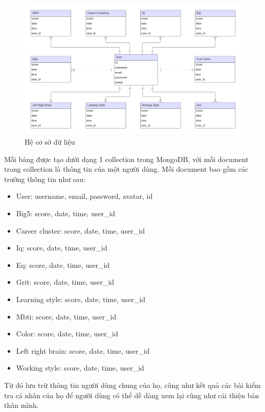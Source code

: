 \begin{figure}[H]
    \centering
    \includegraphics[width=1.0\linewidth]{images/usertable.png}
    \vspace{0.5cm}
    \caption{Hệ cơ sở dữ liệu}
\end{figure}

Mỗi bảng được tạo dưới dạng 1 collection trong MongoDB, với mỗi document trong collection là thông tin của một người dùng. Mỗi document bao gồm các trường thông tin như sau:
\begin{itemize}
    \item User: username, email, password, avatar, id
    \item Big5: score, date, time, user\_id
    \item Career cluster: score, date, time, user\_id
    \item Iq: score, date, time, user\_id
    \item Eq: score, date, time, user\_id
    \item Grit: score, date, time, user\_id
    \item Learning style: score, date, time, user\_id
    \item Mbti: score, date, time, user\_id
    \item Color: score, date, time, user\_id
    \item Left right brain: score, date, time, user\_id
    \item Working style: score, date, time, user\_id
\end{itemize}

Từ đó lưu trữ thông tin người dùng chung của họ, cũng như kết quả các bài kiểm tra cá nhân của họ để người dùng có thể dễ dàng xem lại cũng như
cải thiện bản thân mình.